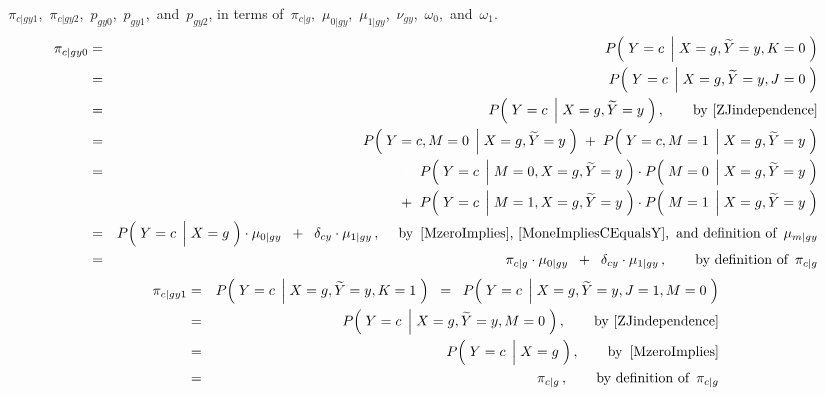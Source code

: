 \begin{enumerate}
\,$\pi_{c \vert gy1}$,
\,$\pi_{c \vert gy2}$,
\,$p_{gy0}$,
\,$p_{gy1}$,
\,and
\,$p_{gy2}$,
in terms of
\,$\pi_{c \vert g}$,
\,$\mu_{0 \vert gy}$,
\,$\mu_{1 \vert gy}$,
\,$\nu_{gy}$,
\,$\omega_{0}$,
\,and
\,$\omega_{1}$.
\begin{eqnarray*}
\pi_{c \vert gy0}
&=&
	P\!\left(\;Y=c\;\left\vert\;X=g,\widetilde{Y}=y,K=0\right.\,\right)
\\
&=&
	P\!\left(\;Y=c\;\left\vert\;X=g,\widetilde{Y}=y,J=0\right.\,\right)
\\
&=&
	P\!\left(\;Y=c\;\left\vert\;X=g,\widetilde{Y}=y\right.\,\right),
	\quad\quad
	\textnormal{by \eqref{ZJindependence}}
\\
&=&
	P\!\left(\;Y=c,M=0\;\left\vert\;X=g,\widetilde{Y}=y\right.\,\right)
	\;+\;
	P\!\left(\;Y=c,M=1\;\left\vert\;X=g,\widetilde{Y}=y\right.\,\right)
\\
&=&
	{\color{white}+}\;\;
	P\!\left(\;Y=c\;\left\vert\;M=0,X=g,\widetilde{Y}=y\right.\,\right)
	\cdot
	P\!\left(\;M=0\;\left\vert\;X=g,\widetilde{Y}=y\right.\,\right)
\\
&&
	+\;\;
	P\!\left(\;Y=c\;\left\vert\;M=1,X=g,\widetilde{Y}=y\right.\,\right)
	\cdot
	P\!\left(\;M=1\;\left\vert\;X=g,\widetilde{Y}=y\right.\,\right)
\\
&=&
	P\!\left(\;Y=c\;\left\vert\;X\overset{{\color{white}-}}{=}g\right.\,\right)
	\cdot
	\mu_{0 \vert gy}
	\;\;+\;\;
	\delta_{cy}
	\cdot
	\mu_{1 \vert gy}\,,
	\quad\;
	\textnormal{by \,\eqref{MzeroImplies}, \eqref{MoneImpliesCEqualsY},\, and definition of \,$\mu_{m \vert gy}$}
\\
&=&
	\pi_{c \vert g}
	\cdot
	\mu_{0 \vert gy}
	\;\;+\;\;
	\delta_{cy}
	\cdot
	\mu_{1 \vert gy}\,,
	\quad\quad
	\textnormal{by definition of \,$\pi_{c \vert g}$}
\end{eqnarray*}
\begin{eqnarray*}
\pi_{c \vert gy1}
&=&
	P\!\left(\;Y=c\;\left\vert\;X=g,\widetilde{Y}=y,K=1\right.\,\right)
\;\;=\;\;
	P\!\left(\;Y=c\;\left\vert\;X=g,\widetilde{Y}=y,J=1,M=0\right.\,\right)
\\
&=&
	P\!\left(\;Y=c\;\left\vert\;X=g,\widetilde{Y}=y,M=0\right.\,\right),
	\quad\quad
	\textnormal{by \eqref{ZJindependence}}
\\
&=&
	P\!\left(\;Y=c\;\left\vert\;X\overset{{\color{white}-}}{=}g\right.\,\right),
	\quad\quad
	\textnormal{by \,\eqref{MzeroImplies}}
\\
&=&
	\pi_{c \vert g}\,,
	\quad\quad
	\textnormal{by definition of \,$\pi_{c \vert g}$}
\end{eqnarray*}
\begin{eqnarray*}

\end{eqnarray*}
\end{enumerate}
